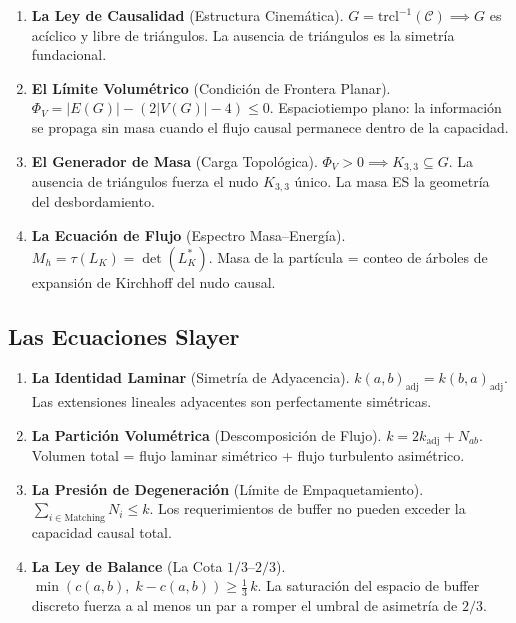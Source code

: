 \documentclass[11pt, a4paper, openany]{book}
\begin{document}
\begin{enumerate}[label=\textbf{\Roman*.}, leftmargin=2.5em]
\item \textbf{La Ley de Causalidad} (Estructura Cinem\'atica).
$G = \mathrm{trcl}^{-1}(\mathcal{C}) \implies G$ es ac\'iclico y
libre de tri\'angulos. La ausencia de tri\'angulos es la simetr\'ia
fundacional.

\item \textbf{El L\'imite Volum\'etrico} (Condici\'on de Frontera Planar).
$\Phi_V = |E(G)| - (2|V(G)| - 4) \leq 0$.
Espaciotiempo plano: la informaci\'on se propaga sin masa cuando el
flujo causal permanece dentro de la capacidad.

\item \textbf{El Generador de Masa} (Carga Topol\'ogica).
$\Phi_V > 0 \implies K_{3,3} \subseteq G$.
La ausencia de tri\'angulos fuerza el nudo $K_{3,3}$ \'unico. La masa
ES la geometr\'ia del desbordamiento.

\item \textbf{La Ecuaci\'on de Flujo} (Espectro Masa--Energ\'ia).
$M_h = \tau(L_K) = \det(L_K^*)$.
Masa de la part\'icula = conteo de \'arboles de expansi\'on de
Kirchhoff del nudo causal.
\end{enumerate}

\subsection{Las Ecuaciones Slayer}

\begin{enumerate}[label=\textbf{\Roman*.}, leftmargin=2.5em]
\item \textbf{La Identidad Laminar} (Simetr\'ia de Adyacencia).
$k(a,b)_{\mathrm{adj}} = k(b,a)_{\mathrm{adj}}$.
Las extensiones lineales adyacentes son perfectamente sim\'etricas.

\item \textbf{La Partici\'on Volum\'etrica} (Descomposici\'on de Flujo).
$k = 2k_{\mathrm{adj}} + N_{ab}$.
Volumen total = flujo laminar sim\'etrico + flujo turbulento
asim\'etrico.

\item \textbf{La Presi\'on de Degeneraci\'on} (L\'imite de Empaquetamiento).
$\sum_{i \in \mathrm{Matching}} N_i \leq k$.
Los requerimientos de buffer no pueden exceder la capacidad causal
total.

\item \textbf{La Ley de Balance} (La Cota $1/3$--$2/3$).
$\min(c(a,b),\; k - c(a,b)) \geq \frac{1}{3}\,k$.
La saturaci\'on del espacio de buffer discreto fuerza a al menos un par
a romper el umbral de asimetr\'ia de $2/3$.
\end{enumerate}
\end{document}
